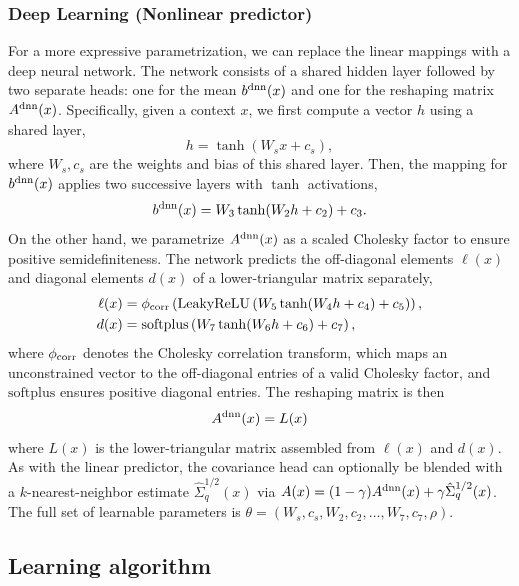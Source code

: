 \subsubsection{Deep Learning (Nonlinear predictor)}
For a more expressive parametrization, we can replace the linear mappings with a deep neural network.
The network consists of a shared hidden layer followed by two separate heads: one for the mean $b^{\rm dnn}(x)$ and one for the reshaping matrix $A^{\rm dnn}(x)$.
Specifically, given a context $x$, we first compute a vector $h$ using a shared layer,
\begin{equation*}
    h = \tanh(W_sx + c_s),
\end{equation*}
where $W_s, c_s$ are the weights and bias of this shared layer.
Then, the mapping for $b^{\rm dnn}(x)$ applies two successive layers with $\tanh$ activations,
\begin{equation*}
    b^{\rm dnn}(x) = W_3\tanh(W_2 h + c_2) + c_3.
\end{equation*}
On the other hand, we parametrize $A^{\rm dnn}(x)$ as a scaled Cholesky factor to ensure positive semidefiniteness.
The network predicts the off-diagonal elements $\ell(x)$ and diagonal elements $d(x)$ of a lower-triangular matrix separately,
\begin{align*}
    \ell(x) &= \phi_{\rm corr}\left(\text{LeakyReLU}\left(W_5\tanh(W_4 h + c_4) + c_5\right)\right), \\
    d(x) &= \text{softplus}\left(W_7\tanh(W_6 h + c_6) + c_7\right),
\end{align*}
where $\phi_{\rm corr}$ denotes the Cholesky correlation transform, which maps an unconstrained vector to the off-diagonal entries of a valid Cholesky factor, and $\text{softplus}$ ensures positive diagonal entries.
The reshaping matrix is then
\begin{equation}
    A^{\rm dnn}(x) = L(x)
\end{equation}
where $L(x)$ is the lower-triangular matrix assembled from $\ell(x)$ and $d(x)$.
As with the linear predictor, the covariance head can optionally be blended with a $k$-nearest-neighbor estimate $\hat{\Sigma}_q^{1/2}(x)$ via $A(x) = (1-\gamma)A^{\rm dnn}(x) + \gamma \hat{\Sigma}_q^{1/2}(x)$.
The full set of learnable parameters is $\theta = (W_s, c_s, W_2, c_2, \dots, W_7, c_7, \rho)$.


\subsection{Learning algorithm}
